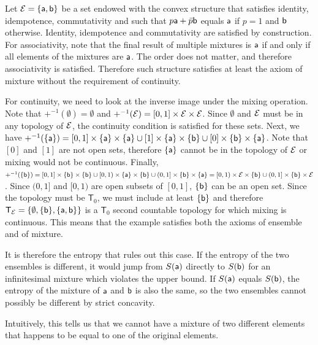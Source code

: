 \begin{example}
	Let $\Ens = \{\ens[a], \ens[b]\}$ be a set endowed with the convex structure that satisfies identity, idempotence, commutativity and such that $p \ens[a] + \bar{p} \ens[b]$ equals $\ens[a]$ if $p=1$ and $\ens[b]$ otherwise. Identity, idempotence and commutativity are satisfied by construction. For associativity, note that the final result of multiple mixtures is $\ens[a]$ if and only if all elements of the mixtures are $\ens[a]$. The order does not matter, and therefore associativity is satisfied. Therefore such structure satisfies at least the axiom of mixture without the requirement of continuity.
	
	For continuity, we need to look at the inverse image under the mixing operation. Note that $+^{-1}(\emptyset) = \emptyset$ and $+^{-1}(\Ens) = [0,1] \times \Ens \times \Ens$. Since $\emptyset$ and $\Ens$ must be in any topology of $\Ens$, the continuity condition is satisfied for these sets. Next, we have  $+^{-1}(\{\ens[a]\}) = [0,1] \times \{\ens[a]\} \times \{\ens[a]\} \cup [1] \times \{\ens[a]\} \times \{\ens[b]\} \cup [0] \times \{\ens[b]\} \times \{\ens[a]\}$. Note that $[0]$ and $[1]$ are not open sets, therefore $\{\ens[a]\}$ cannot be in the topology of $\Ens$ or mixing would not be continuous. Finally, $+^{-1}(\{\ens[b]\}) = [0,1] \times \{\ens[b]\} \times \{\ens[b]\} \cup [0,1) \times \{\ens[a]\} \times \{\ens[b]\} \cup (0,1] \times \{\ens[b]\} \times \{\ens[a]\} = [0,1) \times \Ens \times \{\ens[b]\} \cup (0,1] \times \{\ens[b]\} \times \Ens$. Since $(0,1]$ and $[0,1)$ are open subsets of $[0,1]$, $\{\ens[b]\}$ can be an open set. Since the topology must be $\textsf{T}_0$, we must include at least $\{\ens[b]\}$ and therefore $\mathsf{T}_{\Ens} = \{\emptyset, \{\ens[b]\}, \{\ens[a], \ens[b]\}\}$ is a $\mathsf{T}_0$ second countable topology for which mixing is continuous. This means that the example satisfies both the axioms of ensemble and of mixture.
\end{example}

It is therefore the entropy that rules out this case. If the entropy of the two ensembles is different, it would jump from $S(\ens[a])$ directly to $S(\ens[b])$ for an infinitesimal mixture which violates the upper bound. If $S(\ens[a])$ equals $S(\ens[b])$, the entropy of the mixture of $\ens[a]$ and $\ens[b]$ is also the same, so the two ensembles cannot possibly be different by strict concavity.

Intuitively, this tells us that we cannot have a mixture of two different elements that happens to be equal to one of the original elements.

